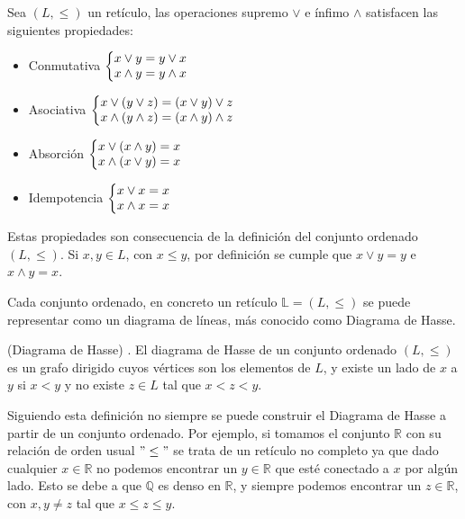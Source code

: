 \documentclass[oneside,openright,titlepage,numbers=noenddot,openany,headinclude,footinclude=true,
cleardoublepage=empty,abstractoff,BCOR=5mm,paper=a4,fontsize=12pt,main=spanish]{scrreprt}
\begin{document}
\begin{proposition} Sea $(L,\leq)$ un retículo, las operaciones supremo $\vee$ e ínfimo $\wedge$ satisfacen las siguientes propiedades:

\begin{itemize}
    \item Conmutativa $\left\{
    \begin{array}{@{} l c @{}}
      x \vee y = y \vee x & \\
      x \wedge y = y \wedge x & 
    \end{array}\right. $
    \item Asociativa $\left\{
    \begin{array}{@{} l c @{}}
      x \vee (y \vee z) = (x \vee y) \vee z& \\
      x \wedge (y \wedge z) = (x \wedge y) \wedge z & 
    \end{array}\right. $
    \item Absorción $\left\{
    \begin{array}{@{} l c @{}}
      x \vee (x \wedge y) = x& \\
      x \wedge (x \vee y) = x & 
    \end{array}\right. $
    \item Idempotencia $\left\{
    \begin{array}{@{} l c @{}}
      x \vee x = x & \\
      x \wedge x = x & 
    \end{array}\right. $
\end{itemize}


\end{proposition}

Estas propiedades son consecuencia de la definición del conjunto ordenado $(L,\leq)$. Si $x,y \in L$, con $x \leq y$, por definición se cumple que $x \vee y= y$ e $x \wedge y=x$.


Cada conjunto ordenado, en concreto un retículo  $\mathbb{L} = (L,\leq)$ se puede representar como un diagrama de líneas, más conocido como Diagrama de Hasse.

\begin{definition}{(Diagrama de Hasse) \cite{mdal}}. El diagrama de Hasse de un conjunto ordenado $(L, \leq)$ es un grafo dirigido cuyos vértices son los elementos de $L$, y existe un lado de $x$ a $y$ si $x<y$ y no existe $z\in L$ tal que $x<z<y$.
\end{definition}

Siguiendo esta definición no siempre se puede construir el Diagrama de Hasse a partir de un conjunto ordenado. Por ejemplo, si tomamos el conjunto $\mathbb{R}$ con su relación de orden usual $"\leq"$ se trata de un retículo no completo ya que dado cualquier $x \in \mathbb{R}$ no podemos encontrar un $ y \in \mathbb{R}$ que esté conectado a $x$ por algún lado. Esto se debe a que $\mathbb{Q}$ es denso en $\mathbb{R}$, y siempre podemos encontrar un $z \in \mathbb{R}$, con $x,y \neq z$ tal que $x \leq z \leq y$.
\end{document}
